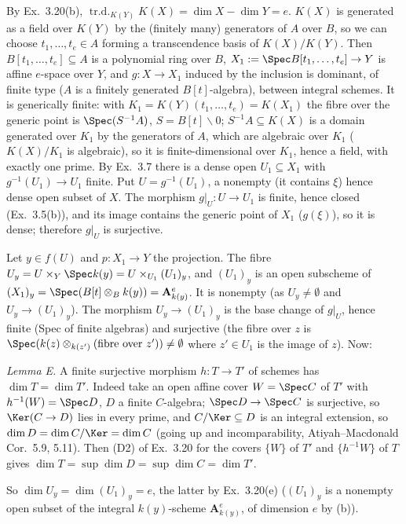 \documentclass[11pt]{article}
\begin{document}
By Ex.~3.20(b), $\operatorname{tr.d.}_{K(Y)}K(X)=\dim X-\dim Y=e$. $K(X)$ is generated as a field over $K(Y)$ by the (finitely many) generators of $A$ over $B$, so we can choose $t_1,\dots,t_e\in A$ forming a transcendence basis of $K(X)/K(Y)$. Then $B[t_1,\dots,t_e]\subseteq A$ is a polynomial ring over $B$, $X_1:=\Spec B[t_1,\dots,t_e]\to Y$ is affine $e$-space over $Y$, and $g:X\to X_1$ induced by the inclusion is dominant, of finite type ($A$ is a finitely generated $B[t]$-algebra), between integral schemes. It is generically finite: with $K_1=K(Y)(t_1,\dots,t_e)=K(X_1)$ the fibre over the generic point is $\Spec(S^{-1}A)$, $S=B[t]\smallsetminus0$; $S^{-1}A\subseteq K(X)$ is a domain generated over $K_1$ by the generators of $A$, which are algebraic over $K_1$ ($K(X)/K_1$ is algebraic), so it is finite-dimensional over $K_1$, hence a field, with exactly one prime. By Ex.~3.7 there is a dense open $U_1\subseteq X_1$ with $g^{-1}(U_1)\to U_1$ finite. Put $U=g^{-1}(U_1)$, a nonempty (it contains $\xi$) hence dense open subset of $X$. The morphism $g|_U:U\to U_1$ is finite, hence closed (Ex.~3.5(b)), and its image contains the generic point of $X_1$ ($g(\xi)$), so it is dense; therefore $g|_U$ is surjective.

Let $y\in f(U)$ and $p:X_1\to Y$ the projection. The fibre $U_y=U\times_Y\Spec k(y)=U\times_{U_1}(U_1)_y$, and $(U_1)_y$ is an open subscheme of $(X_1)_y=\Spec(B[t]\otimes_Bk(y))=\mathbf A^e_{k(y)}$. It is nonempty (as $U_y\neq\emptyset$ and $U_y\to(U_1)_y$). The morphism $U_y\to(U_1)_y$ is the base change of $g|_U$, hence finite (Spec of finite algebras) and surjective (the fibre over $z$ is $\Spec(k(z)\otimes_{k(z')}(\text{fibre over }z'))\ne\emptyset$ where $z'\in U_1$ is the image of $z$). Now:

\emph{Lemma E.} A finite surjective morphism $h:T\to T'$ of schemes has $\dim T=\dim T'$. Indeed take an open affine cover $W=\Spec C$ of $T'$ with $h^{-1}(W)=\Spec D$, $D$ a finite $C$-algebra; $\Spec D\to\Spec C$ is surjective, so $\Ker(C\to D)$ lies in every prime, and $C/\Ker\subseteq D$ is an integral extension, so $\dim D=\dim C/\Ker=\dim C$ (going up and incomparability, Atiyah--Macdonald Cor.~5.9, 5.11). Then (D2) of Ex.~3.20 for the covers $\{W\}$ of $T'$ and $\{h^{-1}W\}$ of $T$ gives $\dim T=\sup\dim D=\sup\dim C=\dim T'$.

So $\dim U_y=\dim(U_1)_y=e$, the latter by Ex.~3.20(e) ($(U_1)_y$ is a nonempty open subset of the integral $k(y)$-scheme $\mathbf A^e_{k(y)}$, of dimension $e$ by (b)).
\end{document}
